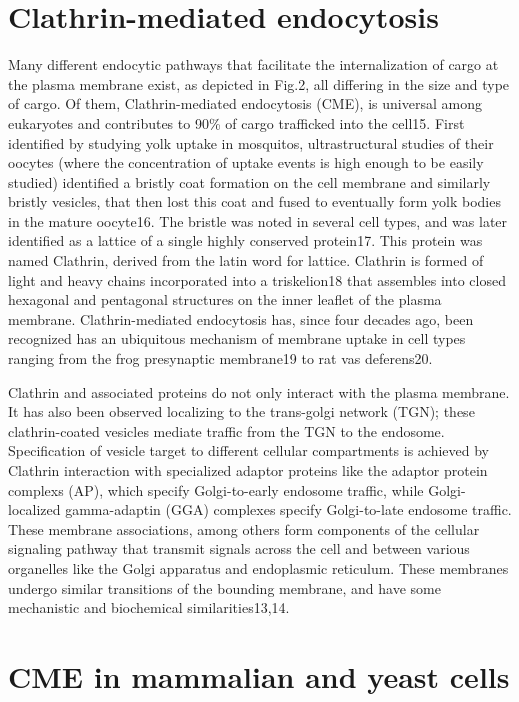 \section{Clathrin-mediated endocytosis}
Many different endocytic pathways that facilitate the internalization of cargo at the plasma membrane exist, as depicted in Fig.2, all differing in the size and type of cargo. Of them, Clathrin-mediated endocytosis (CME), is universal among eukaryotes and contributes to 90\% of cargo trafficked into the cell15. First identified by studying yolk uptake in mosquitos, ultrastructural studies of their oocytes (where the concentration of uptake events is high enough to be easily studied) identified a bristly coat formation on the cell membrane and similarly bristly vesicles, that then lost this coat and fused to eventually form yolk bodies in the mature oocyte16. The bristle was noted in several cell types, and was later identified as a lattice of a single highly conserved protein17. This protein was named Clathrin, derived from the latin word for lattice. Clathrin is formed of light and heavy chains incorporated into a triskelion18 that assembles into closed hexagonal and pentagonal structures on the inner leaflet of the plasma membrane. Clathrin-mediated endocytosis has, since four decades ago, been recognized has an ubiquitous mechanism of membrane uptake in cell types ranging from the frog presynaptic membrane19 to rat vas deferens20. 

\vspace{5mm}
Clathrin and associated proteins do not only interact with the plasma membrane. It has also been observed localizing to the trans-golgi network (TGN); these clathrin-coated vesicles mediate traffic from the TGN to the endosome. Specification of vesicle target to different cellular compartments is achieved by Clathrin interaction with specialized adaptor proteins like the adaptor protein complexs (AP), which specify Golgi-to-early endosome traffic, while Golgi-localized gamma-adaptin (GGA) complexes specify Golgi-to-late endosome traffic. These membrane associations, among others form components of the cellular signaling pathway that transmit signals across the cell and between various organelles like the Golgi apparatus and endoplasmic reticulum. These membranes undergo similar transitions of the bounding membrane, and have some mechanistic and biochemical similarities13,14. 




	
\section{CME in mammalian and yeast cells }
